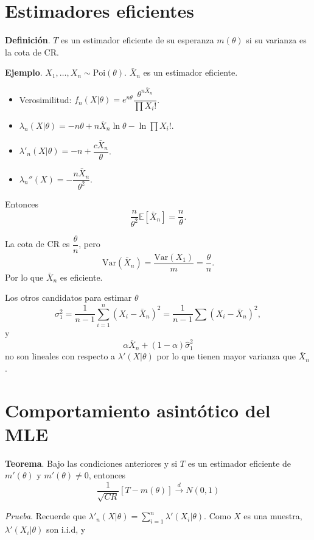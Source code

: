 \documentclass[
  12pt,
]{book}
\begin{document}
\hypertarget{estimadores-eficientes}{%
\section{Estimadores eficientes}\label{estimadores-eficientes}}

\textbf{Definición}. \(T\) es un estimador eficiente de su esperanza \(m(\theta)\) si su varianza es la cota de CR.

\textbf{Ejemplo}. \(X_1,\dots, X_n\sim \text{Poi}(\theta)\). \(\bar X_n\) es un estimador eficiente.

\begin{itemize}
\item
  Verosimilitud: \(f_n(X|\theta) = e ^{n\theta}\dfrac{\theta^{n\bar X_n}}{\prod X_i!}\).
\item
  \(\lambda_n(X|\theta) = -n\theta + n\bar X_n \ln \theta - \ln \prod X_i!\).
\item
  \(\lambda'_n(X|\theta) = -n+\dfrac{c\bar X_n}{\theta}\).
\item
  \(\lambda_n''(X) = -\dfrac{n\bar X_n}{\theta^2}\).
\end{itemize}

Entonces
\[\dfrac{n}{\theta^2}\mathbb E[\bar X_n] = \dfrac n{\theta}.\]

La cota de CR es \(\dfrac \theta n\), pero
\[\text{Var}(\bar X_n) = \dfrac{\text{Var}(X_1)}{m} = \dfrac \theta n.\]
Por lo que \(\bar X_n\) es eficiente.

Los otros candidatos para estimar \(\theta\)
\[\sigma_1^2=\dfrac 1{n-1}\sum_{i=1}^{n}\left(X_{i}-\bar{X}_{n}\right)^{2} = \dfrac 1{n-1}\sum (X_i-\bar X_n)^2,\]
y
\[\alpha \bar X_n + (1-\alpha)\hat\sigma^2_1\]
no son lineales con respecto a \(\lambda'(X|\theta)\) por lo que tienen mayor varianza que \(\bar X_n\).

\hypertarget{comportamiento-asintuxf3tico-del-mle}{%
\section{Comportamiento asintótico del MLE}\label{comportamiento-asintuxf3tico-del-mle}}

\textbf{Teorema}. Bajo las condiciones anteriores y si \(T\) es un estimador eficiente de \(m'(\theta)\) y \(m'(\theta) \neq 0\), entonces
\[\dfrac 1{\sqrt{CR}}[T-m(\theta)]\xrightarrow{d}N(0,1)\]

\emph{Prueba}. Recuerde que \(\lambda'_n(X|\theta) = \sum_{i=1}^n\lambda'(X_i|\theta)\). Como \(X\) es una muestra, \(\lambda'(X_i|\theta)\) son i.i.d, y
\end{document}
